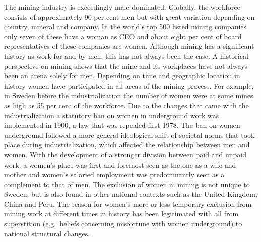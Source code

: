 \documentclass[
  12pt,
]{scrbook}
\begin{document}
The mining industry is exceedingly male-dominated. Globally, the workforce consists of approximately 90 per cent men but with great variation depending on country, mineral and company. In the world's top 500 listed mining companies only seven of these have a woman as CEO and about eight per cent of board representatives of these companies are women. Although mining has a significant history as work for and by men, this has not always been the case. A historical perspective on mining shows that the mine and its workplaces have not always been an arena solely for men. Depending on time and geographic location in history women have participated in all areas of the mining process. For example, in Sweden before the industrialization the number of women were at some mines as high as 55 per cent of the workforce. Due to the changes that came with the industrialization a statutory ban on women in underground work was implemented in 1900, a law that was repealed first 1978. The ban on women underground followed a more general ideological shift of societal norms that took place during industrialization, which affected the relationship between men and women. With the development of a stronger division between paid and unpaid work, a women's place was first and foremost seen as the one as a wife and mother and women's salaried employment was predominantly seen as a complement to that of men. The exclusion of women in mining is not unique to Sweden, but is also found in other national contexts such as the United Kingdom, China and Peru. The reason for women's more or less temporary exclusion from mining work at different times in history has been legitimated with all from superstition (e.g.~beliefs concerning misfortune with women underground) to national structural changes.
\end{document}
